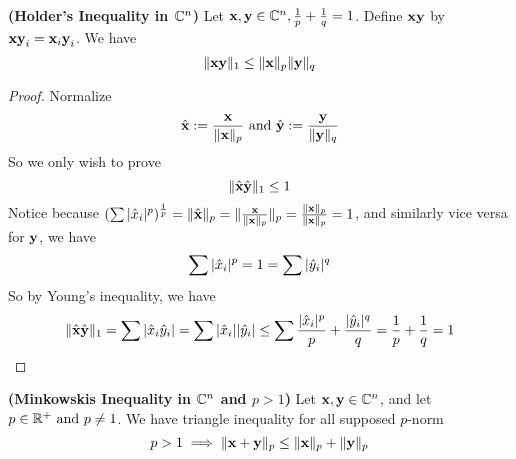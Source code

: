 \documentclass{report}
\begin{document}
\begin{theorem}
\label{4.1.4}
\textbf{(Holder's Inequality in $\mathbb{C}^n$)} Let $\textbf{x},\textbf{y}\in \mathbb{C}^n,\frac{1}{p}+\frac{1}{q}=1$. Define $\textbf{xy}$ by $\textbf{xy}_i=\textbf{x}_i\textbf{y}_i$. We have
\begin{equation}
\| \textbf{xy} \|_1\leq \| \textbf{x} \|_p\| \textbf{y} \|_q
\end{equation}
\end{theorem}
\begin{proof}
Normalize 
\begin{equation}
\hat{\textbf{x}}:= \frac{\textbf{x}}{\| \textbf{x} \|_p}\text{ and }\hat{\textbf{y}}:=\frac{\textbf{y}}{\| \textbf{y} \|_q}
\end{equation}
So we only wish to prove
\begin{equation}
\| \hat{\textbf{x}}\hat{\textbf{y}} \|_1\leq 1 
\end{equation}
Notice because $(\sum |\hat{x}_i|^p)^{\frac{1}{p}}=\| \hat{\textbf{x}} \|_p=\| \frac{\textbf{x}}{\| \textbf{x} \|_p} \|_p=\frac{\| \textbf{x} \|_p}{\| \textbf{x} \|_p}=1$, and similarly vice versa for $\textbf{y}$, we have \begin{equation}
\sum |\hat{x}_i|^p=1=\sum |\hat{y}_i|^q \end{equation} So by Young's inequality, we have \begin{equation} \| \hat{\textbf{x}}\hat{\textbf{y}} \|_1= \sum |\hat{x }_i\hat{y}_i|=\sum |\hat{x}_i||\hat{y}_i|\leq \sum \frac{|\hat{x}_i|^p}{p}+\frac{|\hat{y}_i|^q}{q}=\frac{1}{p}+\frac{1}{q}=1
\end{equation}
\end{proof}
\begin{corollary}
\label{4.1.5}
\textbf{(Minkowskis Inequality in $\mathbb{C}^n$ and $p>1$)} Let $\textbf{x},\textbf{y}\in\mathbb{C}^n$, and let $p\in \mathbb{R}^+\text{ and }p\neq 1$. We have triangle inequality for all supposed $p$-norm
\begin{equation}
p>1\implies  \| \textbf{x}+\textbf{y} \|_p\leq \| \textbf{x} \|_p+\| \textbf{y} \|_p
\end{equation}
\end{corollary}
\end{document}
